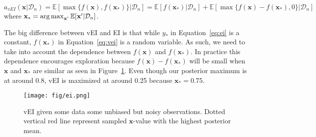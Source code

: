 \begin{definition}[vEI]
    \begin{equation}
        \label{eq:vei}
        a_{vEI}(\mathbf{x} | \mathcal{D}_n) = \mathbb{E}[\max \{ f(\mathbf{x}), f(\mathbf{x}_*) \} | \mathcal{D}_n]
        = \mathbb{E}[f(\mathbf{x}_*) | \mathcal{D}_n] + \mathbb{E}[\max \{ f(\mathbf{x}) - f(\mathbf{x}_*), 0 \} | \mathcal{D}_n]
    \end{equation}
    where $\mathbf{x}_* = \operatorname*{arg\,max}_{\mathbf{x'}} \mathbb{E}[\mathbf{x'} | \mathcal{D}_n]$.
\end{definition}

The big difference between vEI and EI is that while $y_*$ in Equation~\ref{eq:ei} is a constant, $f(\mathbf{x}_*)$ in Equation~\ref{eq:vei} is a random variable.
As such, we need to take into account the dependence between $f(\mathbf{x})$ and $f(\mathbf{x}_*)$.
In practice this dependence encourages exploration because $f(\mathbf{x}) - f(\mathbf{x}_*)$ will be small when $\mathbf{x}$ and $\mathbf{x}_*$ are similar as seen in Figure~\ref{fig:ei}.
Even though our posterior maximum is at around 0.8, vEI is maximized at around 0.25 because $\mathbf{x}_* = 0.75$.

\begin{figure}[h]
    \centering
    \texttt{[image: fig/ei.png]}
    \caption{vEI given some data some unbiased but noisy observations.
        Dotted vertical red line represent sampled $\mathbf{x}$-value with the highest posterior mean.
    }
    \label{fig:ei}
\end{figure}

